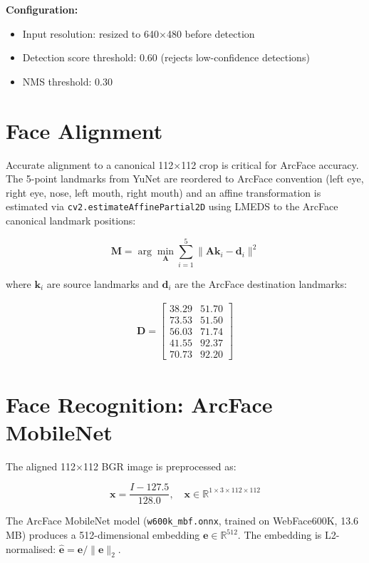 \documentclass[12pt,a4paper]{report}
\begin{document}
\textbf{Configuration:}
\begin{itemize}
  \item Input resolution: resized to 640$\times$480 before detection
  \item Detection score threshold: 0.60 (rejects low-confidence detections)
  \item NMS threshold: 0.30
\end{itemize}

\section{Face Alignment}
Accurate alignment to a canonical 112$\times$112 crop is critical for ArcFace accuracy. The 5-point landmarks from YuNet are reordered to ArcFace convention (left eye, right eye, nose, left mouth, right mouth) and an affine transformation is estimated via \texttt{cv2.estimateAffinePartial2D} using LMEDS to the ArcFace canonical landmark positions:

\begin{equation}
  \mathbf{M} = \arg\min_{\mathbf{A}} \sum_{i=1}^{5} \| \mathbf{A} \mathbf{k}_i - \mathbf{d}_i \|^2
\end{equation}

where $\mathbf{k}_i$ are source landmarks and $\mathbf{d}_i$ are the ArcFace destination landmarks:

\begin{align*}
  \mathbf{D} = \begin{bmatrix}
    38.29 & 51.70 \\
    73.53 & 51.50 \\
    56.03 & 71.74 \\
    41.55 & 92.37 \\
    70.73 & 92.20
  \end{bmatrix}
\end{align*}

\section{Face Recognition: ArcFace MobileNet}
The aligned 112$\times$112 BGR image is preprocessed as:

\begin{equation}
  \mathbf{x} = \frac{I - 127.5}{128.0}, \quad \mathbf{x} \in \mathbb{R}^{1 \times 3 \times 112 \times 112}
\end{equation}

The ArcFace MobileNet model (\texttt{w600k\_mbf.onnx}, trained on WebFace600K, 13.6 MB) produces a 512-dimensional embedding $\mathbf{e} \in \mathbb{R}^{512}$. The embedding is L2-normalised: $\hat{\mathbf{e}} = \mathbf{e} / \|\mathbf{e}\|_2$.
\end{document}
